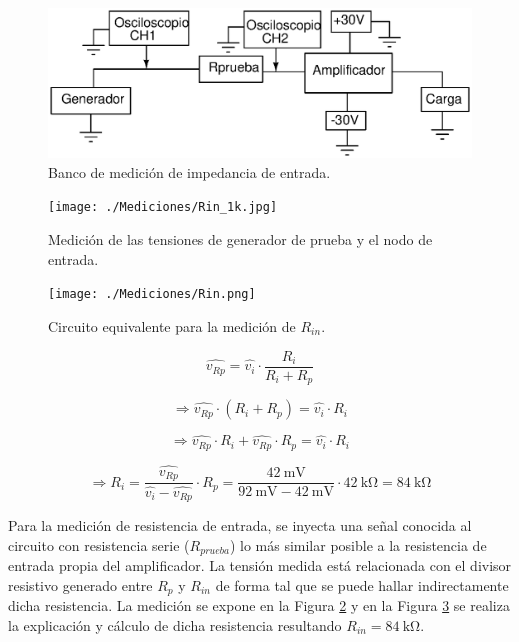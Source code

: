 		\begin{figure}[ H]
			\centering
			\includegraphics[scale=0.6]{./Figuras/bco_zo.eps}
			\caption{Banco de medición de impedancia de entrada.}
			\label{fig:rin_bco_med}
		\end{figure}
			
		\begin{figure}[ H]
			\centering
			\texttt{[image: ./Mediciones/Rin\_1k.jpg]}
			\caption{Medición de las tensiones de generador de prueba y el nodo de entrada.}
			\label{fig:rin_med}
		\end{figure}

		\begin{figure}[ H]
			\centering
			\texttt{[image: ./Mediciones/Rin.png]}
			\caption{Circuito equivalente para la medición de $R_{in}$.}
			\label{fig:Rin_cequiv}
		\end{figure}

		\begin{equation*}
			\hat{{v}_{Rp}}  = \hat{{v}_{i}} \cdot {\frac{R_i}{{R_i}+{R_p}}}
		\end{equation*}

		\begin{equation*}
			\Rightarrow \hat{{v}_{Rp}} \cdot (R_i+R_p)  = \hat{{v}_{i}} \cdot {R_i} 
		\end{equation*}

		\begin{equation*}
			\Rightarrow \hat{{v}_{Rp}} \cdot R_i+\hat{{v}_{Rp}} \cdot R_p  = \hat{{v}_{i}} \cdot {R_i} 
		\end{equation*}

		\begin{equation*}
			\Rightarrow R_i = \frac{\hat{{v}_{Rp}}}{\hat{{v}_{i}}-\hat{{v}_{Rp}}} \cdot R_p  = \frac{\SI{42}{\mV}}{\SI{92}{\mV} - \SI{42}{\mV}} \cdot \SI{42}{\kilo\ohm}  = \boxed{\SI{84}{\kilo\ohm}}
		\end{equation*}

		Para la medición de resistencia de entrada, se inyecta una señal conocida al circuito con resistencia serie ($R_{prueba}$) lo más similar posible a la resistencia de entrada propia del amplificador. La tensión medida está relacionada con el divisor resistivo generado entre $R_{p}$ y $R_{in}$ de forma tal que se puede hallar indirectamente dicha resistencia. La medición se expone en la Figura \ref{fig:rin_med} y en la Figura \ref{fig:Rin_cequiv} se realiza la explicación y cálculo de dicha resistencia resultando $\boxed{R_{in}=\SI{84}{\kilo\ohm}}$.\\

